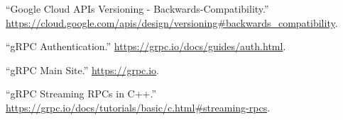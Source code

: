 \documentclass[11pt]{article}
\begin{document}
{{\begin{thebibliography}{37}
\mdbibitemlabel{{}[7]}\textquotedblleft{}Google Cloud APIs Versioning - Backwards-Compatibility.\textquotedblright{} \href{https://cloud.google.com/apis/design/versioning\%23backwards_compatibility}{{\ttfamily https://\hspace{0pt}cloud.\hspace{0pt}google.\hspace{0pt}com/\hspace{0pt}apis/\hspace{0pt}design/\hspace{0pt}versioning\#\hspace{0pt}backwards\_\hspace{0pt}compatibility}}.\label{apiversioningbackwardscompatibility}%

\mdbibitemlabel{{}[8]}\textquotedblleft{}gRPC Authentication.\textquotedblright{} \href{https://grpc.io/docs/guides/auth.html}{{\ttfamily https://\hspace{0pt}grpc.\hspace{0pt}io/\hspace{0pt}docs/\hspace{0pt}guides/\hspace{0pt}auth.\hspace{0pt}html}}.\label{grpcauth}%

\mdbibitemlabel{{}[9]}\textquotedblleft{}gRPC Main Site.\textquotedblright{} \href{https://grpc.io}{{\ttfamily https://\hspace{0pt}grpc.\hspace{0pt}io}}.\label{grpc}%

\mdbibitemlabel{{}[10]}\textquotedblleft{}gRPC Streaming RPCs in C++.\textquotedblright{} \href{https://grpc.io/docs/tutorials/basic/c.html\%23streaming-rpcs}{{\ttfamily https://\hspace{0pt}grpc.\hspace{0pt}io/\hspace{0pt}docs/\hspace{0pt}tutorials/\hspace{0pt}basic/\hspace{0pt}c.\hspace{0pt}html\#\hspace{0pt}streaming-\hspace{0pt}rpcs}}.\label{grpcstreamc}%


\end{thebibliography}}}
\end{document}
